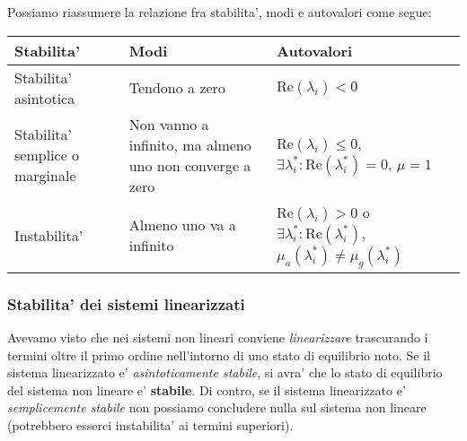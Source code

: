 \documentclass[a4paper,11pt]{article}
\begin{document}
Possiamo riassumere la relazione fra stabilita', modi e autovalori come segue:
\begin{table}[H]
	\center {}
	\begin{tabular} { p{3.5cm} | p{5cm} | p{5cm} }
		\bfseries Stabilita' & \bfseries Modi & \bfseries Autovalori \\
		\hline
		Stabilita' asintotica & Tendono a zero & $\mathrm{Re}(\lambda_i) < 0$ \\
	Stabilita' semplice o marginale & Non vanno a infinito, ma almeno uno non converge a zero & $\mathrm{Re}(\lambda_i) \leq 0$, $\exists \lambda_i^* : \mathrm{Re}(\lambda_i^*) = 0$, $\mu = 1$ \\
Instabilita' & Almeno uno va a infinito & $\mathrm{Re}(\lambda_i) > 0$ o $\exists \lambda_i^* : \mathrm{Re}(\lambda_i^*)$, $\mu_a(\lambda_i^*) \neq \mu_g(\lambda_i^*)$ \\
	\end{tabular}
\end{table}

\subsubsection{Stabilita' dei sistemi linearizzati}
Avevamo visto che nei sistemi non lineari conviene \textit{linearizzare} trascurando i termini oltre il primo ordine nell'intorno di uno stato di equilibrio noto.
Se il sistema linearizzato e' \textit{asintoticamente stabile}, si avra' che lo stato di equilibrio del sistema non lineare e' \textbf{stabile}.
Di contro, se il sistema linearizzato e' \textit{semplicemente stabile} non possiamo concludere nulla sul sistema non lineare (potrebbero esserci instabilita' ai termini superiori).
\end{document}

